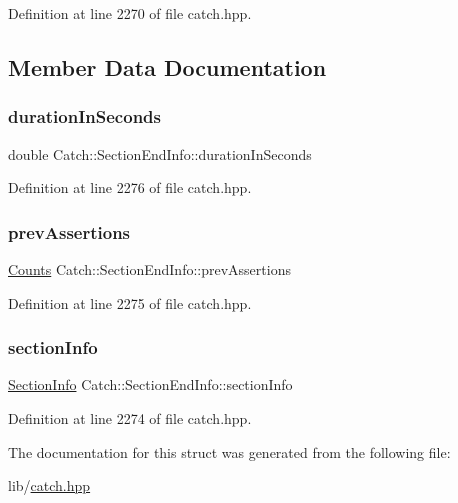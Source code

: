 Definition at line 2270 of file catch.\+hpp.



\subsection{Member Data Documentation}
\hypertarget{struct_catch_1_1_section_end_info_a7c262f2dab9cff166b8eca620c47eea5}{}\label{struct_catch_1_1_section_end_info_a7c262f2dab9cff166b8eca620c47eea5} 
\subsubsection{\texorpdfstring{duration\+In\+Seconds}{durationInSeconds}}
{\footnotesize\ttfamily double Catch\+::\+Section\+End\+Info\+::duration\+In\+Seconds}



Definition at line 2276 of file catch.\+hpp.

\hypertarget{struct_catch_1_1_section_end_info_ae70b154cbc05b5dd2901d97f89303d8c}{}\label{struct_catch_1_1_section_end_info_ae70b154cbc05b5dd2901d97f89303d8c} 
\subsubsection{\texorpdfstring{prev\+Assertions}{prevAssertions}}
{\footnotesize\ttfamily \hyperlink{struct_catch_1_1_counts}{Counts} Catch\+::\+Section\+End\+Info\+::prev\+Assertions}



Definition at line 2275 of file catch.\+hpp.

\hypertarget{struct_catch_1_1_section_end_info_a2d44793392cb83735d086d726822abe9}{}\label{struct_catch_1_1_section_end_info_a2d44793392cb83735d086d726822abe9} 
\subsubsection{\texorpdfstring{section\+Info}{sectionInfo}}
{\footnotesize\ttfamily \hyperlink{struct_catch_1_1_section_info}{Section\+Info} Catch\+::\+Section\+End\+Info\+::section\+Info}



Definition at line 2274 of file catch.\+hpp.



The documentation for this struct was generated from the following file\+:\begin{DoxyCompactItemize}
\item 
lib/\hyperlink{catch_8hpp}{catch.\+hpp}\end{DoxyCompactItemize}
